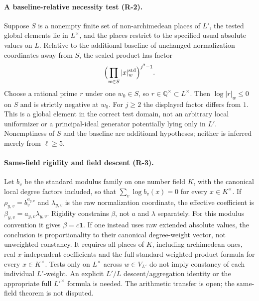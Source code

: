 \documentclass[11pt,a4paper]{article}
\theoremstyle{definition}
\theoremstyle{remark}
\begin{document}
\paragraph{A baseline-relative necessity test (R-2).}
Suppose $S$ is a nonempty finite set of non-archimedean places of $L'$,
the tested global elements lie in $L^\times$, and the places restrict to
the specified usual absolute values on $L$. Relative to the additional
baseline of unchanged normalization coordinates away from $S$, the
scaled product has factor
\[
 \Bigl(\prod_{w\in S}|x|_w^{\mathrm{std}}\Bigr)^{j^2-1}.
\]
Choose a rational prime $r$ under one $w_0\in S$, so $r\in\mathbb Q^\times
\subset L^\times$. Then $\log|r|_w\le0$ on $S$ and is strictly negative at
$w_0$. For $j\ge2$ the displayed factor differs from $1$. This is a global
element in the correct test domain, not an arbitrary local uniformizer or
a principal-ideal generator potentially lying only in $L'$. Nonemptiness
of $S$ and the baseline are additional hypotheses; neither is inferred
merely from $\ell\ge5$.

\paragraph{Same-field rigidity and field descent (R-3).}
Let $b_v$ be the standard modulus family on one number field $K$, with
the canonical local degree factors included, so that
$\sum_v\log b_v(x)=0$ for every $x\in K^\times$. If
$\rho_{y,v}=b_v^{a_{y,v}}$ and $\lambda_{y,v}$ is the raw normalization
coordinate, the effective coefficient is $\beta_{y,v}=a_{y,v}\lambda_{y,v}$.
Rigidity constrains $\beta$, not $a$ and $\lambda$ separately.
For this modulus convention it gives $\beta=c\mathbf1$. If one instead
uses raw extended absolute values, the conclusion is proportionality to
their canonical degree-weight vector, not unweighted constancy. It requires
all places of $K$, including archimedean ones, real $x$-independent
coefficients and the full standard weighted product formula for every
$x\in K^\times$. Tests only on $L^\times$ across $w\in V_{L'}$ do not
imply constancy of each individual $L'$-weight. An explicit $L'/L$
descent/aggregation identity or the appropriate full $L'^\times$ formula
is needed. The arithmetic transfer is open; the same-field theorem is
not disputed.
\end{document}
